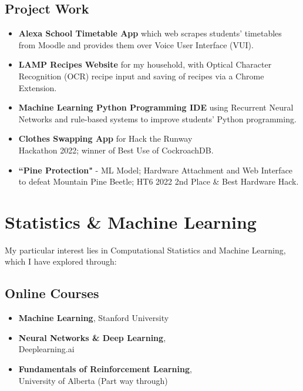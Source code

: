 \documentclass{Resume}
\begin{document}
		\subsection{Project Work}
			\begin{itemize}[itemsep=1mm, parsep=0pt]
				\item \textbf{Alexa School Timetable App} which web scrapes students' timetables from Moodle and provides them over Voice User Interface (VUI).
				\item \textbf{LAMP Recipes Website} for my household, with Optical Character Recognition (OCR) recipe input and saving of recipes via a Chrome Extension.
				\item \textbf{Machine Learning Python Programming IDE} using Recurrent Neural Networks and rule-based systems to improve students' Python programming. %
				\item \textbf{Clothes Swapping App} for Hack the Runway \\ Hackathon 2022; winner of Best Use of CockroachDB.
				\item \textbf{``Pine Protection"} - ML Model; Hardware Attachment and Web Interface to defeat Mountain Pine Beetle; HT6 2022 2nd Place \& Best Hardware Hack.
			\end{itemize}

	\section{Statistics \& Machine Learning}
	    My particular interest lies in Computational Statistics and Machine Learning, which I have explored through:
			
		\subsection{Online Courses}
			\begin{itemize}[itemsep=1mm, parsep=0pt]
				\item \textbf{Machine Learning}, Stanford University
				\item \textbf{Neural Networks \& Deep Learning}, \\ Deeplearning.ai 
				\item \textbf{Fundamentals of Reinforcement Learning}, \\ University of Alberta (Part way through)
			\end{itemize}
\end{document}
